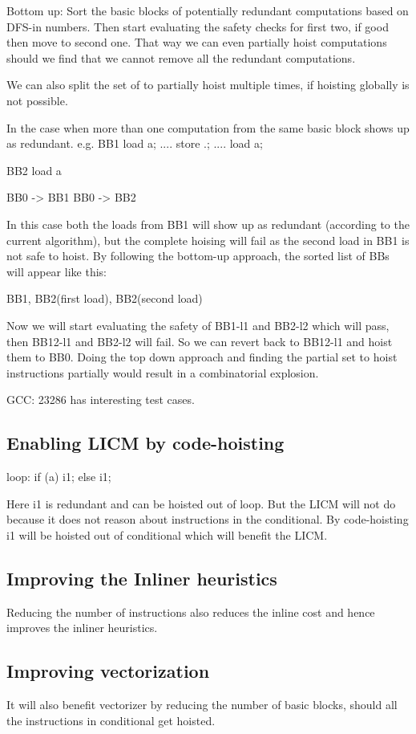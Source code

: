 \begin{section}
Bottom up:
Sort the basic blocks of potentially redundant computations based on DFS-in numbers.
Then start evaluating the safety checks for first two, if good then move to second one. That way we can even
partially hoist computations should we find that we cannot remove all the redundant computations.

We can also split the set of to partially hoist multiple times, if hoisting globally is not possible.

In the case when more than one computation from the same basic block shows up as redundant.
e.g.
BB1
load a;
....
store .;
....
load a;


BB2
load a

BB0 -> BB1
BB0 -> BB2

In this case both the loads from BB1 will show up as redundant (according to the current algorithm), but the complete
hoising will fail as the second load in BB1 is not safe to hoist. By following the bottom-up approach, the sorted list
of BBs will appear like this:

{ BB1, BB2(first load), BB2(second load) }

Now we will start evaluating the safety of BB1-l1 and BB2-l2 which will pass, then BB12-l1 and BB2-l2 will fail.
So we can revert back to BB12-l1 and hoist them to BB0. Doing the top down approach and finding the partial set
to hoist instructions partially would result in a combinatorial explosion.

GCC: 23286 has interesting test cases.



\section{Enabling LICM by code-hoisting}
loop:
if (a)
  i1;
else
  i1;

Here i1 is redundant and can be hoisted out of loop. But the LICM will not do because it does not reason about instructions in the conditional.
By code-hoisting i1 will be hoisted out of conditional which will benefit the LICM.

\section{Improving the Inliner heuristics}
Reducing the number of instructions also reduces the inline cost and hence improves the inliner heuristics.

\section{Improving vectorization}
It will also benefit vectorizer by reducing the number
of basic blocks, should all the instructions in conditional get hoisted.


\end{section}


